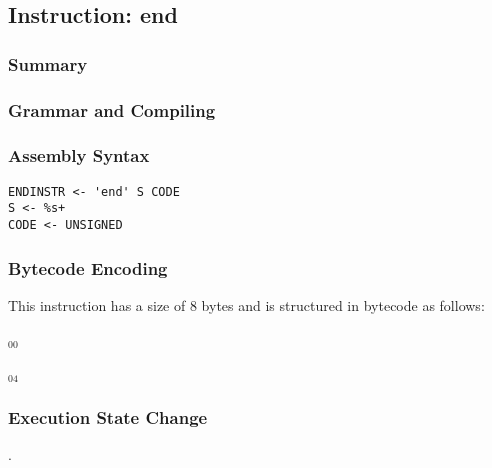 \subsection{Instruction: end}

\subsubsection{Summary}


\subsubsection{Grammar and Compiling}


\subsubsection{Assembly Syntax}

\begin{myquote}
\begin{verbatim}
ENDINSTR <- 'end' S CODE
S <- %s+
CODE <- UNSIGNED
\end{verbatim}
\end{myquote}


\subsubsection{Bytecode Encoding}

This instruction has a size of 8 bytes and is structured in bytecode as follows:

$_{00}$\ 



$_{04}$\ 


\subsubsection{Execution State Change}

.


